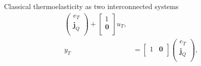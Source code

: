 \documentclass[aspectratio=169]{ISAE-Beamer}
\begin{document}
\begin{frame}{Classical thermoelasticity as two interconnected systems}
\begin{equation*}
\begin{aligned}
\begin{pmatrix}
e_T \\
\bm{j}_Q \\
\end{pmatrix} + 
\begin{bmatrix}
1 \\
\bm{0} \\
\end{bmatrix} u_T, \\
y_T &= \begin{bmatrix}
1 & \bm{0} \\
\end{bmatrix} \begin{pmatrix}
e_T \\
\bm{j}_Q \\
\end{pmatrix},
\end{aligned}
\end{equation*} 

\end{frame}
\end{document}
